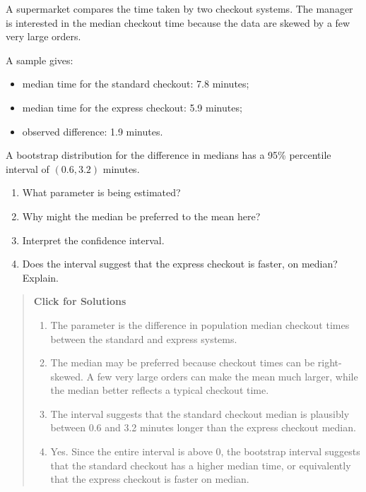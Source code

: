 \documentclass[
  letterpaper,
  DIV=11,
  numbers=noendperiod]{scrreprt}
\providecommand{\tightlist}{%
  \setlength{\itemsep}{0pt}\setlength{\parskip}{0pt}}
\begin{document}
\begin{tcolorbox}[enhanced jigsaw, arc=.35mm, bottomrule=.15mm, bottomtitle=1mm, breakable, colback=white, colbacktitle=quarto-callout-note-color!10!white, colframe=quarto-callout-note-color-frame, coltitle=black, left=2mm, leftrule=.75mm, opacityback=0, opacitybacktitle=0.6, rightrule=.15mm, title=\textcolor{quarto-callout-note-color}{\faInfo}\hspace{0.5em}{Question 5}, titlerule=0mm, toprule=.15mm, toptitle=1mm]

A supermarket compares the time taken by two checkout systems. The
manager is interested in the median checkout time because the data are
skewed by a few very large orders.

A sample gives:

\begin{itemize}
\tightlist
\item
  median time for the standard checkout: 7.8 minutes;
\item
  median time for the express checkout: 5.9 minutes;
\item
  observed difference: 1.9 minutes.
\end{itemize}

A bootstrap distribution for the difference in medians has a 95\%
percentile interval of \((0.6, 3.2)\) minutes.

\begin{enumerate}
\def\labelenumi{(\alph{enumi})}
\item
  What parameter is being estimated?
\item
  Why might the median be preferred to the mean here?
\item
  Interpret the confidence interval.
\item
  Does the interval suggest that the express checkout is faster, on
  median? Explain.
\end{enumerate}

\begin{quote}
\textbf{Click for Solutions}

\begin{enumerate}
\def\labelenumi{(\alph{enumi})}
\item
  The parameter is the difference in population median checkout times
  between the standard and express systems.
\item
  The median may be preferred because checkout times can be
  right-skewed. A few very large orders can make the mean much larger,
  while the median better reflects a typical checkout time.
\item
  The interval suggests that the standard checkout median is plausibly
  between 0.6 and 3.2 minutes longer than the express checkout median.
\item
  Yes. Since the entire interval is above 0, the bootstrap interval
  suggests that the standard checkout has a higher median time, or
  equivalently that the express checkout is faster on median.
\end{enumerate}
\end{quote}

\end{tcolorbox}
\end{document}
